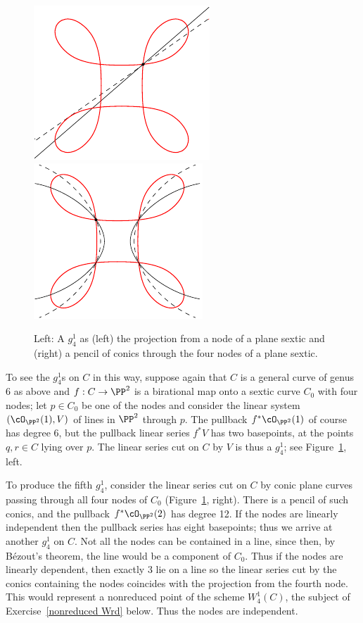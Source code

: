 \begin{figure}[b]
\hskip0pt
\hbox{\includegraphics[width=0.36\hsize]{main/Fig11-2-new}\quad}
\includegraphics[width=0.34\hsize]{main/Fig11-3-new}
\caption{Left: A $g^1_4$ as (left)
the projection from a node of a plane sextic
and (right)
a pencil of conics through the four nodes of a
plane sextic.
}
\label{plane sextic 1}
\end{figure}

To see the $g^{1}_{4}$s on $C$ in this way,  suppose again that $C$ is a
general curve of genus 6 as above and $f : C \to \PP^2$ is a birational
map onto a sextic curve $C_0$ with four nodes; let $p \in C_0$ be one of
the nodes and consider the linear system $(\cO_{\PP^2}(1),V)$ of lines
in $\PP^2$ through $p$. The pullback $f^*\cO_{\PP^2}(1)$ of course has
degree 6, but the pullback linear series $f^*V$ has two basepoints,
at the points $q, r \in C$ lying over $p$. The linear series cut on $C$
by $V$ is thus a $g^1_4$; see Figure~\ref{plane sextic 1}, left.

To produce the fifth $g^1_4$, consider the linear series cut on
$C$ by conic plane curves passing through all four nodes of $C_0$
(Figure~\ref{plane sextic 1}, right).  There is a pencil of such conics, and
the pullback $f^*\cO_{\PP^2}(2)$ has degree 12.
If the nodes are linearly independent then the pullback series has eight
basepoints; thus we arrive at another $g^1_4$ on $C$.  Not all the nodes
can be contained in a line, since then, by B\'ezout's theorem, the line
%
would be a component of $C_0$. Thus if the nodes are linearly dependent,
then exactly 3 lie on a line
so the linear series cut by the conics containing the nodes coincides
with the projection from the
fourth
node.
This would represent a nonreduced point of the scheme $W^1_4(C)$,
the subject of Exercise~\ref{nonreduced Wrd} below. Thus the nodes
are independent.

